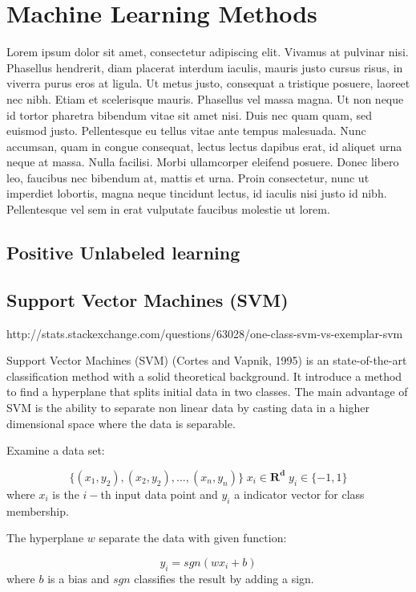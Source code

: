 \chapter{Machine Learning Methods}

Lorem ipsum dolor sit amet, consectetur adipiscing elit. Vivamus at pulvinar nisi. Phasellus hendrerit, diam placerat interdum iaculis, mauris justo cursus risus, in viverra purus eros at ligula. Ut metus justo, consequat a tristique posuere, laoreet nec nibh. Etiam et scelerisque mauris. Phasellus vel massa magna. Ut non neque id tortor pharetra bibendum vitae sit amet nisi. Duis nec quam quam, sed euismod justo. Pellentesque eu tellus vitae ante tempus malesuada. Nunc accumsan, quam in congue consequat, lectus lectus dapibus erat, id aliquet urna neque at massa. Nulla facilisi. Morbi ullamcorper eleifend posuere. Donec libero leo, faucibus nec bibendum at, mattis et urna. Proin consectetur, nunc ut imperdiet lobortis, magna neque tincidunt lectus, id iaculis nisi justo id nibh. Pellentesque vel sem in erat vulputate faucibus molestie ut lorem.

\section{Positive Unlabeled learning}

\section {Support Vector Machines (SVM)}

http://stats.stackexchange.com/questions/63028/one-class-svm-vs-exemplar-svm

Support Vector Machines (SVM) (Cortes and Vapnik, 1995) is an state-of-the-art classification method with a solid theoretical background. It introduce a method to find a hyperplane that splits initial data in two classes. The main advantage of SVM is the ability to separate non linear data by casting data in a higher dimensional space where the data is separable.

Examine a data set:
 
\[ \{(x_1,y_2), (x_2,y_2), ...,(x_n,y_n) \} \; x_i \in \mathbf{R^d} \; y_i \in \{-1,1\} \]
where \( x_i\) is the \( i-\)th input data point and \( y_i\)  a indicator vector for class membership.

The hyperplane \(w\) separate the data with given function:

\[y_i = sgn(wx_i + b) \] 
where \(b\) is a bias and \(sgn\) classifies the result by adding a sign.

